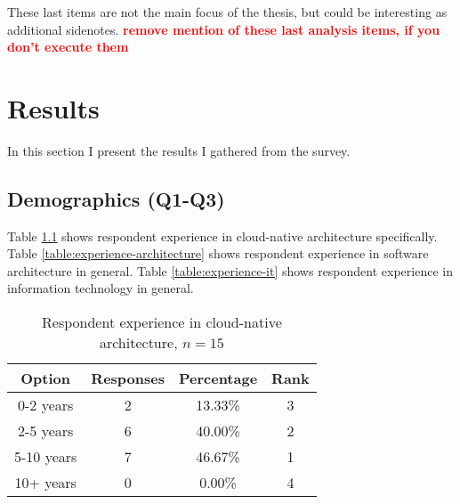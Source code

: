 \documentclass[utf8,english]{gradu3}
\newcommand{\todo}[1]{\textbf{\textcolor{red}{#1}}}
\begin{document}
These last items are not the main focus of the thesis, but could be interesting
as additional sidenotes.  \todo{remove mention of these last analysis items, if
  you don't execute them}

\chapter{Results}
\label{chapter:results}

In this section I present the results I gathered from the survey.

\section{Demographics (Q1-Q3)}

Table \ref{table:experience-cna} shows respondent experience in cloud-native architecture specifically.
Table \ref{table:experience-architecture} shows respondent experience in software architecture in general.
Table \ref{table:experience-it} shows respondent experience in information technology in general.

\begin{table}[!h]
  \begin{center}
    \caption{Respondent experience in cloud-native architecture, $n = 15$}
    \label{table:experience-cna}
    \begin{tabular}{|c|c|c|c|}
      \hline
      \textbf{Option} & \textbf{Responses} & \textbf{Percentage} & \textbf{Rank} \\
      \hline
      0-2 years       & 2                  & 13.33\%             & 3             \\
      2-5 years       & 6                  & 40.00\%             & 2             \\
      5-10 years      & 7                  & 46.67\%             & 1             \\
      10+ years       & 0                  & 0.00\%              & 4             \\
      \hline
    \end{tabular}
  \end{center}
\end{table}
\end{document}
